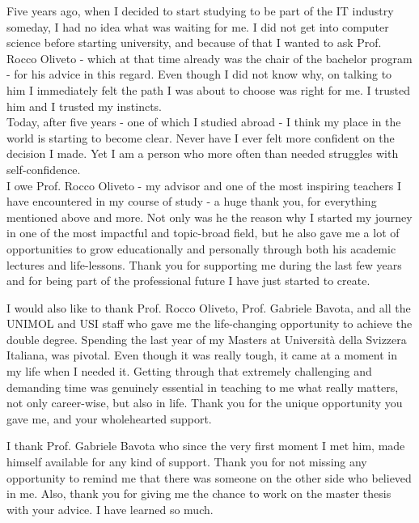 \begin{acknowledgements}

\addchaptertocentry{\acknowledgementname}
Five years ago, when I decided to start studying to be part of the IT industry someday, 
I had no idea what was waiting for me. 
I did not get into computer science before starting university, and because of that 
I wanted to ask Prof. Rocco Oliveto - which at that time already was the chair of the bachelor program - for his advice 
in this regard. Even though I did not know why, on talking to him I immediately felt the path I was about to choose was right for me. 
I trusted him and I trusted my instincts. \\
Today, after five years - one of which I studied abroad - I think my place in the world is starting to become clear.
Never have I ever felt more confident on the decision I made. Yet I am a person who more often than needed struggles with self-confidence.\\
\newline
I owe Prof. Rocco Oliveto - my advisor and one of the most inspiring teachers I have encountered
in my course of study - a huge thank you, for everything mentioned above and more. Not only was he the reason why I started my journey in one of the most impactful and topic-broad field, 
but he also gave me a lot of opportunities to grow educationally and personally through both his academic lectures and life-lessons.
Thank you for supporting me during the last few years and for being part of the professional future I have just started to create.

I would also like to thank Prof. Rocco Oliveto, Prof. Gabriele Bavota, and all the UNIMOL and USI staff who gave me the life-changing opportunity to 
achieve the double degree. 
Spending the last year of my Masters at Università della Svizzera Italiana, was pivotal. Even though it was
really tough, it came at a moment in my life when I needed it. 
Getting through that extremely challenging and demanding 
time was genuinely essential in teaching to me what really matters, not only career-wise, but also in life. Thank you 
for the unique opportunity you gave me, and your wholehearted support.

I thank Prof. Gabriele Bavota who since the very first moment I met him, made himself available for any kind of support. 
Thank you for not missing any opportunity to remind me that there was someone on the other side who believed in me. Also, thank you 
for giving me the chance to work on the master thesis with your advice. I have learned so much.


\end{acknowledgements}
